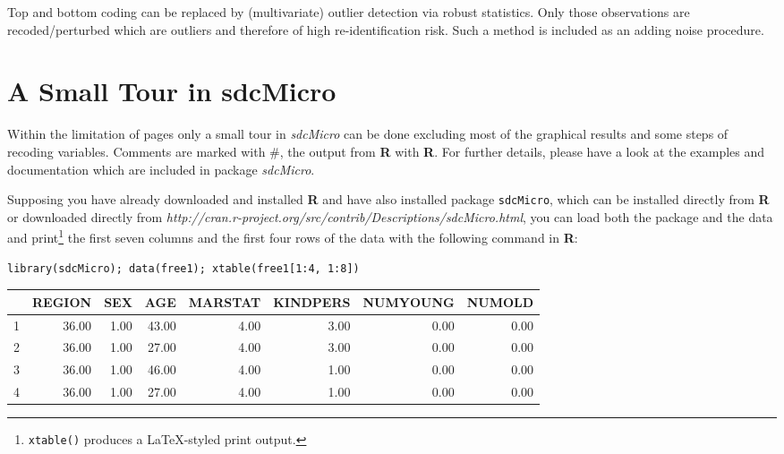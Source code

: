 \documentclass[12pt]{article}
\begin{document}
Top and bottom coding can be replaced by (multivariate) outlier detection via robust statistics. Only those observations are recoded/perturbed which are outliers and therefore of high re-identification risk. Such a method is included as an adding noise procedure.


\section{A Small Tour in sdcMicro}
\label{Tour}

Within the limitation of pages only a small tour in {\it sdcMicro} can be done excluding most of the graphical results and some steps of recoding variables. Comments are marked with \#, the output from {\bf R} with {\bf R}. For further details, please have a look at the examples and documentation which are included in package {\it sdcMicro}. 

Supposing you have already downloaded and installed {\bf R} and have also installed package {\tt sdcMicro}, which can be installed directly from {\bf R} or downloaded directly from {\it http://cran.r-project.org/src/contrib/Descriptions/sdcMicro.html}, you can load both the package and the data and print\footnote{{\tt xtable()} produces a \LaTeX-styled print output. } the first seven columns and the first four rows of the data with the following command in {\bf R}:

\begin{footnotesize}
\begin{verbatim}
library(sdcMicro); data(free1); xtable(free1[1:4, 1:8])
\end{verbatim}
\end{footnotesize}

\small
\begin{center}
\begin{tabular}{rrrrrrrr}
  \hline
 & REGION & SEX & AGE & MARSTAT & KINDPERS & NUMYOUNG & NUMOLD \\
  \hline
1 & 36.00 & 1.00 & 43.00 & 4.00 & 3.00 & 0.00 & 0.00 \\
  2 & 36.00 & 1.00 & 27.00 & 4.00 & 3.00 & 0.00 & 0.00 \\
  3 & 36.00 & 1.00 & 46.00 & 4.00 & 1.00 & 0.00 & 0.00 \\
  4 & 36.00 & 1.00 & 27.00 & 4.00 & 1.00 & 0.00 & 0.00 \\
   \hline
\end{tabular}
\end{center}
\normalsize
\end{document}
